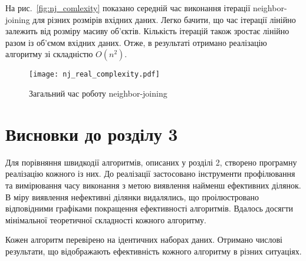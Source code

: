                 На рис.~\ref{fig:nj_comlexity} показано середній час виконання ітерації neighbor-joining для різних розмірів вхідних даних. Легко бачити, що час ітерації лінійно залежить від розміру масиву об’єктів. Кількість ітерацій також зростає лінійно разом із об’ємом вхідних даних. Отже, в результаті отримано реалізацію алгоритму зі складністю $O(n^2)$.
                
                \begin{figure}
                    \centering
                    \texttt{[image: nj\_real\_complexity.pdf]}
                    \caption{Загальний час роботу neighbor-joining}\label{fig:nj_real_comlexity}
                \end{figure}
                
        \section{Висновки до розділу 3}
            Для порівняння швидкодії алгоритмів, описаних у розділі 2, створено програмну реалізацію кожного із них. До реалізації застосовано інструменти профілювання та вимірювання часу виконання з метою виявлення найменш ефективних ділянок. В міру виявлення нефективні ділянки видалялись, що проілюстровано відповідними графіками покращення ефективності алгоритмів. Вдалось досягти мінімальної теоретичної складності кожного алгоритму.
            
            Кожен алгоритм перевірено на ідентичних наборах даних. Отримано числові результати, що відображають ефективність кожного алгоритму в різних ситуаціях. 
                
